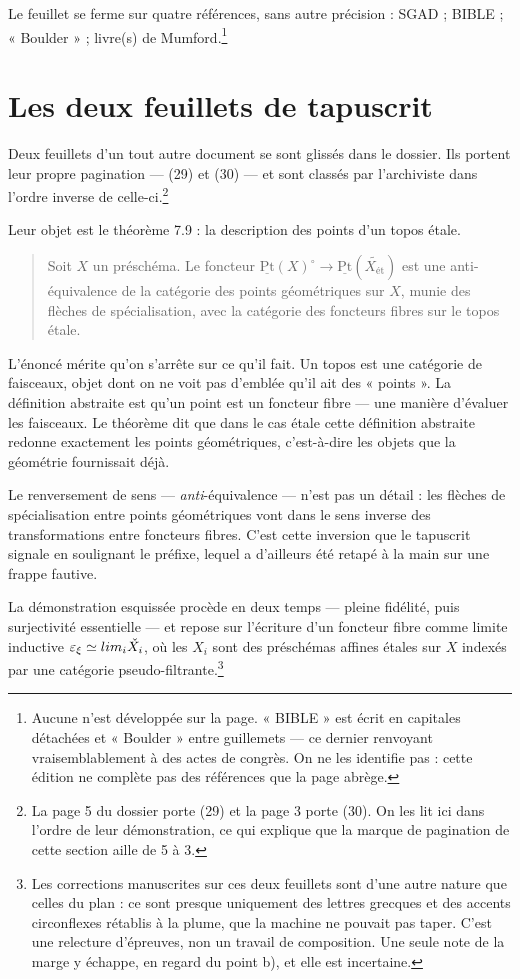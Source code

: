 \documentclass[11pt,a4paper]{article}
\begin{document}
Le feuillet se ferme sur quatre références, sans autre précision : SGAD ; BIBLE ;
« Boulder » ; livre(s) de Mumford.\footnote{Aucune n'est développée sur la page.
« BIBLE » est écrit en capitales détachées et « Boulder » entre guillemets ---
ce dernier renvoyant vraisemblablement à des actes de congrès. On ne les
identifie pas : cette édition ne complète pas des références que la page abrège.}

\section*{Les deux feuillets de tapuscrit}

Deux feuillets d'un tout autre document se sont glissés dans le dossier. Ils
portent leur propre pagination --- (29) et (30) --- et sont classés par
l'archiviste dans l'ordre inverse de celle-ci.\footnote{La page 5 du dossier
porte (29) et la page 3 porte (30). On les lit ici dans l'ordre de leur
démonstration, ce qui explique que la marque de pagination de cette section
aille de 5 à 3.}

Leur objet est le théorème 7.9 : la description des points d'un topos étale.

\begin{quote}
Soit $X$ un préschéma. Le foncteur
$\underline{\mathrm{Pt}}(X)^{\circ} \to \underline{\mathrm{Pt}}
(\widetilde{X_{\text{ét}}})$ est une anti-équivalence de la catégorie des
points géométriques sur $X$, munie des flèches de spécialisation, avec la
catégorie des foncteurs fibres sur le topos étale.
\end{quote}

L'énoncé mérite qu'on s'arrête sur ce qu'il fait. Un topos est une catégorie de
faisceaux, objet dont on ne voit pas d'emblée qu'il ait des « points ». La
définition abstraite est qu'un point est un foncteur fibre --- une manière
d'évaluer les faisceaux. Le théorème dit que dans le cas étale cette définition
abstraite redonne exactement les points géométriques, c'est-à-dire les objets
que la géométrie fournissait déjà.

Le renversement de sens --- \emph{anti}-équivalence --- n'est pas un détail :
les flèches de spécialisation entre points géométriques vont dans le sens
inverse des transformations entre foncteurs fibres. C'est cette inversion que
le tapuscrit signale en soulignant le préfixe, lequel a d'ailleurs été retapé à
la main sur une frappe fautive.

La démonstration esquissée procède en deux temps --- pleine fidélité, puis
surjectivité essentielle --- et repose sur l'écriture d'un foncteur fibre comme
limite inductive $\varepsilon_{\xi} \simeq \varinjlim_{i} \check{X_{i}}$, où
les $X_{i}$ sont des préschémas affines étales sur $X$ indexés par une catégorie
pseudo-filtrante.\footnote{Les corrections manuscrites sur ces deux feuillets
sont d'une autre nature que celles du plan : ce sont presque uniquement des
lettres grecques et des accents circonflexes rétablis à la plume, que la
machine ne pouvait pas taper. C'est une relecture d'épreuves, non un travail de
composition. Une seule note de la marge y échappe, en regard du point b), et
elle est incertaine.}
\end{document}
